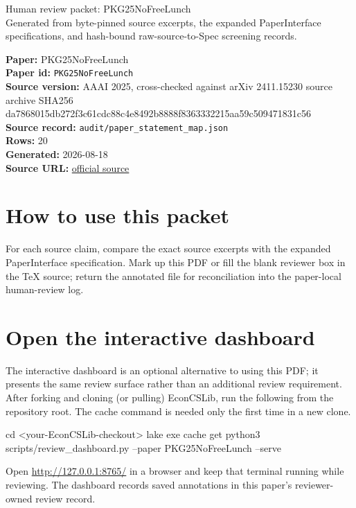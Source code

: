 \documentclass[10pt]{article}
\begin{document}
\fontsize{9}{10}\selectfont

\begin{center}
{\LARGE Human review packet: PKG25NoFreeLunch}\\[0.35em]
\small Generated from byte-pinned source excerpts, the expanded PaperInterface
specifications, and hash-bound raw-source-to-Spec screening records.
\end{center}

\noindent\textbf{Paper:} PKG25NoFreeLunch\\
\textbf{Paper id:} \texttt{PKG25NoFreeLunch}\\
\textbf{Source version:} AAAI 2025, cross-checked against arXiv 2411.15230 source archive SHA256 da7868015db272f3c61cdc88c4e8492b8888f8363332215aa59c509471831c56\\
\textbf{Source record:} \texttt{audit/paper\_statement\_map.json}\\
\textbf{Rows:} 20\\
\textbf{Generated:} 2026-08-18\\
\textbf{Source URL:} \href{https://ojs.aaai.org/index.php/AAAI/article/view/33574/35729}{official source}

\noindent{}\par



\section*{How to use this packet}
For each source claim, compare the exact source excerpts with the expanded
PaperInterface specification. Mark up this PDF or fill the blank reviewer box in the TeX source;
return the annotated file for reconciliation into the paper-local human-review
log.

\section*{Open the interactive dashboard}
The interactive dashboard is an optional alternative to using this PDF; it
presents the same review surface rather than an additional review requirement.
After forking and cloning (or pulling) EconCSLib, run the following from the
repository root. The cache command is needed only the first time in a new clone.
\begin{ReviewVerbatim}
cd <your-EconCSLib-checkout>
lake exe cache get
python3 scripts/review_dashboard.py --paper PKG25NoFreeLunch --serve
\end{ReviewVerbatim}
Open \url{http://127.0.0.1:8765/} in a browser and keep that terminal running
while reviewing. The dashboard records saved annotations in this paper's
reviewer-owned review record.
\end{document}
